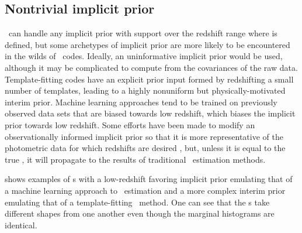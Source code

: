 
\subsection{Nontrivial implicit prior}

\Chippr\ can handle any implicit prior with support over the redshift range where \nz is defined, but some archetypes of implicit prior are more likely to be encountered in the wilds of \pzpdf\ codes.
Ideally, an uninformative implicit prior would be used, although it may be complicated to compute from the covariances of the raw data.  
Template-fitting codes have an explicit prior input formed by redshifting a small number of templates, leading to a highly nonuniform but physically-motivated interim prior.
Machine learning approaches tend to be trained on previously observed data sets that are biased towards low redshift, which biases the implicit prior towards low redshift.
Some efforts have been made to modify an observationally informed implicit prior so that it is more representative of the photometric data for which redshifts are desired \citep{Sheldon2012}, but, unless it is equal to the true \nz, it will propagate to the results of traditional \nz\ estimation methods.  

 shows examples of \pzpdf s with a low-redshift favoring implicit prior emulating that of a machine learning approach to \pz\ estimation and a more complex interim prior emulating that of a template-fitting \pz\ method.
One can see that the \pzpdf s take different shapes from one another even though the marginal histograms are identical.

